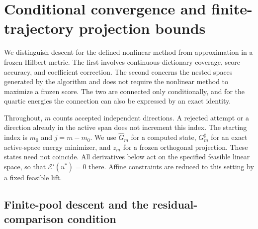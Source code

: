 \documentclass[11pt]{article}
\def\CGAChapterFiveStandalone{1}
\theoremstyle{remark}
\begin{document}
\setcounter{section}{4}
\fi
\providecommand{\cE}{\mathcal E}
\providecommand{\cD}{\mathcal D}
\providecommand{\cP}{\mathcal P}
\providecommand{\cK}{\mathcal K}
\providecommand{\cnorm}[1]{\left\lVert#1\right\rVert}
\providecommand{\cabs}[1]{\left|#1\right|}
\providecommand{\cinner}[2]{\left\langle#1,#2\right\rangle}
\providecommand{\cdd}{\,\mathrm d}
\providecommand{\cR}{\mathbb R}

\ifdefined\CGAChapterFiveStandalone
  \newcommand{\CGAHLDreference}{Section~3}
  \newcommand{\CGAEnergyMetricReference}{the energy--distance theorem and metric corollary in Section~4}
  \newcommand{\CGAEnergyTheoremReference}{the energy--distance theorem in Section~4}
\else
  \newcommand{\CGAHLDreference}{Section~\ref{sec:descent}}
  \newcommand{\CGAEnergyMetricReference}{Theorem~\ref{thm:energy-v} and Corollary~\ref{cor:metric-rates}}
  \newcommand{\CGAEnergyTheoremReference}{Theorem~\ref{thm:energy-v}}
\fi

\section{Conditional convergence and finite-trajectory projection bounds}
\label{sec:c5}

We distinguish descent for the defined nonlinear method from approximation
in a frozen Hilbert metric. The first involves continuous-dictionary coverage,
score accuracy, and coefficient correction. The second concerns the nested
spaces generated by the algorithm and does not require the nonlinear method to
maximize a frozen score. The two are connected only conditionally, and for the
quartic energies the connection can also be expressed by an exact identity.

Throughout, $m$ counts accepted independent directions. A rejected attempt or
a direction already in the active span does not increment this index.
The starting index is $m_0$ and $j=m-m_0$. We use $\widehat G_m$ for a computed
state, $G_m^\sharp$ for an exact active-space energy minimizer, and $z_m$
for a frozen orthogonal projection. These states need not coincide.
All derivatives below act on the specified feasible linear space, so that
$\cE'(u^*)=0$ there. Affine constraints are reduced to this setting by a
fixed feasible lift.

\subsection{Finite-pool descent and the residual-comparison condition}
\label{sec:c5-descent}
\end{document}
